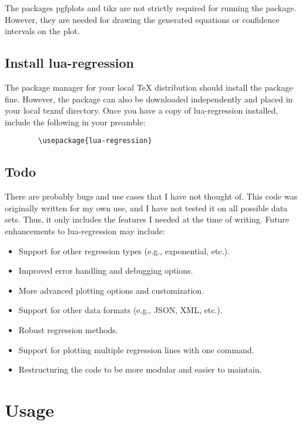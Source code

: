 \documentclass[11pt]{article}
\begin{document}
    The packages {\ttfamily pgfplots} and {\ttfamily tikz} are not strictly required for running the package.
    However, they are needed for drawing the generated equations or confidence intervals on the plot.

    \subsection{Install {\ttfamily lua-regression}}

    The package manager for your local TeX distribution should install the package fine.
    However, the package can also be downloaded independently and placed in your local texmf directory.
    Once you have a copy of {\ttfamily lua-regression} installed, include the following in your preamble:

    \begin{verbatim}
        \usepackage{lua-regression}
    \end{verbatim}

    \subsection{Todo}

    There are probably bugs and use cases that I have not thought of.
    This code was originally written for my own use, and I have not tested it on all possible data sets.
    Thus, it only includes the features I needed at the time of writing.
    Future enhancements to {\ttfamily lua-regression} may include:

    \begin{itemize}
        \item Support for other regression types (e.g., exponential, etc.).
        \item Improved error handling and debugging options.
        \item More advanced plotting options and customization.
        \item Support for other data formats (e.g., JSON, XML, etc.).
        \item Robust regression methods.
        \item Support for plotting multiple regression lines with one command.
        \item Restructuring the code to be more modular and easier to maintain.
    \end{itemize}

    \section{Usage}
\end{document}

